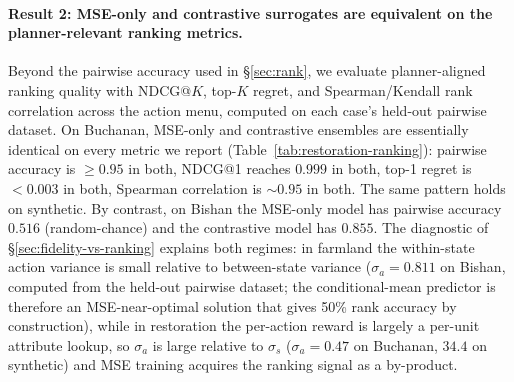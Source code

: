\documentclass[11pt]{article}
\begin{document}
\paragraph{Result 2: MSE-only and contrastive surrogates are equivalent on the planner-relevant ranking metrics.} Beyond the pairwise accuracy used in \S\ref{sec:rank}, we evaluate planner-aligned ranking quality with NDCG@$K$, top-$K$ regret, and Spearman/Kendall rank correlation across the action menu, computed on each case's held-out pairwise dataset. On Buchanan, MSE-only and contrastive ensembles are essentially identical on every metric we report (Table~\ref{tab:restoration-ranking}): pairwise accuracy is $\geq 0.95$ in both, NDCG@1 reaches $0.999$ in both, top-1 regret is $< 0.003$ in both, Spearman correlation is $\sim 0.95$ in both. The same pattern holds on synthetic. By contrast, on Bishan the MSE-only model has pairwise accuracy $0.516$ (random-chance) and the contrastive model has $0.855$. The diagnostic of \S\ref{sec:fidelity-vs-ranking} explains both regimes: in farmland the within-state action variance is small relative to between-state variance ($\sigma_a = 0.811$ on Bishan, computed from the held-out pairwise dataset; the conditional-mean predictor is therefore an MSE-near-optimal solution that gives 50\% rank accuracy by construction), while in restoration the per-action reward is largely a per-unit attribute lookup, so $\sigma_a$ is large relative to $\sigma_s$ ($\sigma_a = 0.47$ on Buchanan, $34.4$ on synthetic) and MSE training acquires the ranking signal as a by-product.
\end{document}
